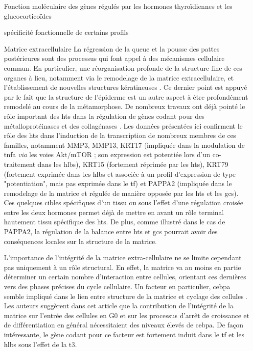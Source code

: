 \documentclass[../main.tex]{subfiles}
\begin{document}
\begin{chapter}{Fonction moléculaire des gènes régulés par les hormones thyroïdiennes et les glucocorticoïdes}
\begin{section}{spécificité fonctionnelle de certains profils}
\begin{subsection}{Matrice extracellulaire}
La régression de la queue et la pousse des pattes postérieures sont des processus qui font appel à des mécanismes cellulaire commun.
En particulier, une réorganisation profonde de la structure fine de ces organes à lieu, notamment via le remodelage de la matrice extracellulaire, et l'établissement de nouvelles structures kératineuses \citep{Schreiber2003}.
Ce dernier point est appuyé par le fait que la structure de l'épiderme est un autre aspect à être profondément remodelé au cours de la métamorphose.
De nombreux travaux ont déjà pointé le rôle important des \glspl{ht} dans la régulation de gènes codant pour des métalloprotéinases et des collagénases \citep{Jung2004,Fu2007}.
Les données présentées ici confirment le rôle des \glspl{ht} dans l'induction de la transcription de nombreux membres de ces familles, notamment MMP3, MMP13, KRT17 (impliquée dans la modulation de \gls{tnfa} \textit{via} les voies Akt/mTOR ; son expression est potentiée lors d'un co-traitement dans les \glspl{hlb}), KRT15 (fortement réprimée par les \glspl{ht}), KRT79 (fortement exprimée dans les \glspl{hlb} et associée à un profil d'expression de type "potentiation", mais pas exprimée dans le \gls{tf}) et PAPPA2 (impliquée dans le remodelage de la matrice et régulée de manière opposée par les \glspl{ht} et les \glspl{gc}).
Ces quelques cibles spécifiques d'un tissu ou sous l'effet d'une régulation croisée entre les deux hormones permet déjà de mettre en avant un rôle terminal hautement tissu spécifique des \glspl{ht}.
De plus, comme illustré dans le cas de PAPPA2, la régulation de la balance entre \glspl{ht} et \glspl{gc} pourrait avoir des conséquences locales sur la structure de la matrice.
\par
L'importance de l'intégrité de la matrice extra-cellulaire ne se limite cependant pas uniquement à un rôle structural.
En effet, la matrice va au moins en partie déterminer un certain nombre d'interaction entre cellules, orientant ces dernières vers des phases précises du cycle cellulaire.
Un facteur en particulier, \gls{cebpa} semble impliqué dans le lien entre structure de la matrice et cyclage des cellules \citep{Rana1994}.
Les auteurs suggèrent dans cet article que la contribution de l'intégrité de la matrice sur l'entrée des cellules en G0 et sur les processus d’arrêt de croissance et de différentiation en général nécessitaient des niveaux élevés de \gls{cebpa}.
De façon intéressante, le gène codant pour ce facteur est fortement induit dans le \gls{tf} et les \glspl{hlb} sous l'effet de la \gls{t3}.

\end{subsection}
\end{section}
\end{chapter}
\end{document}
